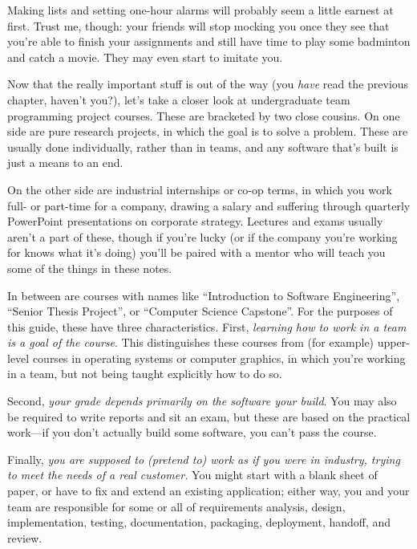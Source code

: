 \documentclass{report}
\begin{document}
Making lists and setting one-hour alarms will probably seem a little
earnest at first.  Trust me, though: your friends will stop mocking
you once they see that you're able to finish your assignments and
still have time to play some badminton and catch a movie.  They may
even start to imitate you.


Now that the really important stuff is out of the way (you \emph{have}
read the previous chapter, haven't you?), let's take a closer look at
undergraduate team programming project courses.  These are bracketed
by two close cousins.  On one side are pure research projects, in
which the goal is to solve a problem.  These are usually done
individually, rather than in teams, and any software that's built is
just a means to an end.

On the other side are industrial internships or co-op terms, in which
you work full- or part-time for a company, drawing a salary and
suffering through quarterly PowerPoint presentations on corporate
strategy.  Lectures and exams usually aren't a part of these, though
if you're lucky (or if the company you're working for knows what it's
doing) you'll be paired with a mentor who will teach you some of the
things in these notes.

In between are courses with names like ``Introduction to Software
Engineering'', ``Senior Thesis Project'', or ``Computer Science
Capstone''.  For the purposes of this guide, these have three
characteristics.  First, \emph{learning how to work in a team is a
goal of the course}.  This distinguishes these courses from (for
example) upper-level courses in operating systems or computer
graphics, in which you're working in a team, but not being taught
explicitly how to do so.

Second, \emph{your grade depends primarily on the software your
build}.  You may also be required to write reports and sit an exam,
but these are based on the practical work---if you don't actually
build some software, you can't pass the course.

Finally, \emph{you are supposed to (pretend to) work as if you were in
industry, trying to meet the needs of a real customer.}  You might
start with a blank sheet of paper, or have to fix and extend an
existing application; either way, you and your team are responsible
for some or all of requirements analysis, design, implementation,
testing, documentation, packaging, deployment, handoff, and review.
\end{document}
